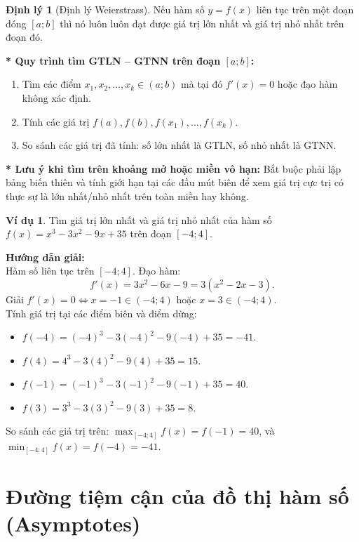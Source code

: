 \documentclass[12pt,a4paper]{article}
\theoremstyle{definition}
\newtheorem{vd}{Ví dụ}[section]
\newtheorem{dl}{Định lý}[section]
\begin{document}
\begin{dl}[Định lý Weierstrass]
Nếu hàm số $y = f(x)$ liên tục trên một đoạn đóng $[a; b]$ thì nó luôn luôn đạt được giá trị lớn nhất và giá trị nhỏ nhất trên đoạn đó.
\end{dl}

\noindent \textbf{* Quy trình tìm GTLN -- GTNN trên đoạn $[a; b]$:}
\begin{enumerate}
    \item Tìm các điểm $x_1, x_2, \dots, x_k \in (a; b)$ mà tại đó $f'(x) = 0$ hoặc đạo hàm không xác định.
    \item Tính các giá trị $f(a), f(b), f(x_1), \dots, f(x_k)$.
    \item So sánh các giá trị đã tính: số lớn nhất là GTLN, số nhỏ nhất là GTNN.
\end{enumerate}

\noindent \textbf{* Lưu ý khi tìm trên khoảng mở hoặc miền vô hạn:} Bắt buộc phải lập bảng biến thiên và tính giới hạn tại các đầu mút biên để xem giá trị cực trị có thực sự là lớn nhất/nhỏ nhất trên toàn miền hay không.

\begin{vd}
Tìm giá trị lớn nhất và giá trị nhỏ nhất của hàm số $f(x) = x^3 - 3x^2 - 9x + 35$ trên đoạn $[-4; 4]$.
\end{vd}
\noindent \textbf{Hướng dẫn giải:} \\
Hàm số liên tục trên $[-4; 4]$. Đạo hàm:
\[
f'(x) = 3x^2 - 6x - 9 = 3(x^2 - 2x - 3).
\]
Giải $f'(x) = 0 \iff x = -1 \in (-4; 4)$ hoặc $x = 3 \in (-4; 4)$. \\
Tính giá trị tại các điểm biên và điểm dừng:
\begin{itemize}
    \item $f(-4) = (-4)^3 - 3(-4)^2 - 9(-4) + 35 = -41$.
    \item $f(4) = 4^3 - 3(4)^2 - 9(4) + 35 = 15$.
    \item $f(-1) = (-1)^3 - 3(-1)^2 - 9(-1) + 35 = 40$.
    \item $f(3) = 3^3 - 3(3)^2 - 9(3) + 35 = 8$.
\end{itemize}
So sánh các giá trị trên: $\max_{[-4; 4]} f(x) = f(-1) = 40$, và $\min_{[-4; 4]} f(x) = f(-4) = -41$.

\vspace{5mm}
\section{Đường tiệm cận của đồ thị hàm số (Asymptotes)}
\end{document}
